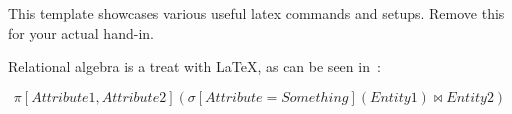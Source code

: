 \documentclass{article}
\begin{document}
\printfront

This template showcases various useful latex commands and setups.
Remove this for your actual hand-in.

\task{}
Relational algebra is a treat with \LaTeX, as can be seen in~:

\begin{equation}
\label{eq:ans}
\pi\left[Attribute1,Attribute2\right](\sigma\left[Attribute=Something\right](Entity1) \Join Entity2)
\end{equation}

\task{}
\end{document}
